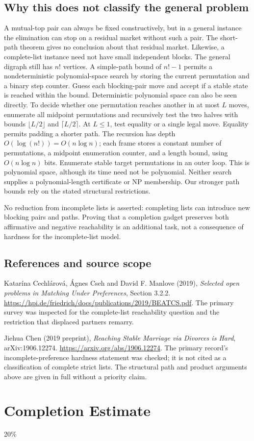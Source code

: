 \documentclass[11pt,a4paper]{article}
\begin{document}
\subsection*{Why this does not classify the general problem}
A mutual-top pair can always be fixed constructively, but in a general instance the elimination can stop on a residual market without such a pair. The short-path theorem gives no conclusion about that residual market. Likewise, a complete-list instance need not have small independent blocks. The general digraph still has $n!$ vertices. A simple-path bound of $n!-1$ permits a nondeterministic polynomial-space search by storing the current permutation and a binary step counter. Guess each blocking-pair move and accept if a stable state is reached within the bound. Deterministic polynomial space can also be seen directly. To decide whether one permutation reaches another in at most $L$ moves, enumerate all midpoint permutations and recursively test the two halves with bounds $\lfloor L/2\rfloor$ and $\lceil L/2\rceil$. At $L\le1$, test equality or a single legal move. Equality permits padding a shorter path. The recursion has depth $O(\log(n!))=O(n\log n)$; each frame stores a constant number of permutations, a midpoint enumeration counter, and a length bound, using $O(n\log n)$ bits. Enumerate stable target permutations in an outer loop. This is polynomial space, although its time need not be polynomial. Neither search supplies a polynomial-length certificate or NP membership. Our stronger path bounds rely on the stated structural restrictions.

No reduction from incomplete lists is asserted: completing lists can introduce new blocking pairs and paths. Proving that a completion gadget preserves both affirmative and negative reachability is an additional task, not a consequence of hardness for the incomplete-list model.

\subsection*{References and source scope}
Katar\'ina Cechl\'arov\'a, \'Agnes Cseh and David F. Manlove (2019), \emph{Selected open problems in Matching Under Preferences}, Section 3.2.2. \url{https://hpi.de/friedrich/docs/publications/2019/BEATCS.pdf}. The primary survey was inspected for the complete-list reachability question and the restriction that displaced partners remarry.

Jiehua Chen (2019 preprint), \emph{Reaching Stable Marriage via Divorces is Hard}, arXiv:1906.12274. \url{https://arxiv.org/abs/1906.12274}. The primary record's incomplete-preference hardness statement was checked; it is not cited as a classification of complete strict lists. The structural path and product arguments above are given in full without a priority claim.

\section{Completion Estimate}
20\%
\end{document}
